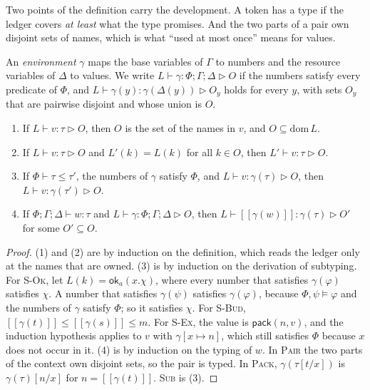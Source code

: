 \documentclass[acmsmall,nonacm,screen]{acmart}
\newcommand{\kw}[1]{\mathsf{#1}}
\newcommand{\ok}[2]{\kw{ok}_{#1}(#2)}
\newcommand{\pack}[2]{\kw{pack}(#1, #2)}
\newcommand{\sem}[1]{[\![#1]\!]}
\newcommand{\dom}{\mathrm{dom}\,}
\newcommand{\own}{\mathrel{\triangleright}}
\begin{document}
Two points of the definition carry the development. A token has a type if the ledger covers
\emph{at least} what the type promises. And the two parts of a pair own disjoint sets of
names, which is what ``used at most once'' means for values.

An \emph{environment} $\gamma$ maps the base variables of $\Gamma$ to numbers and the resource
variables of $\Delta$ to values. We write $L \vdash \gamma : \Phi; \Gamma; \Delta \own O$ if
the numbers satisfy every predicate of $\Phi$, and
$L \vdash \gamma(y) : \gamma(\Delta(y)) \own O_y$ holds for every $y$, with sets $O_y$ that
are pairwise disjoint and whose union is $O$.

\begin{lemma}[Values]
\label{lem:values}
\begin{enumerate}
\item If $L \vdash v : \tau \own O$, then $O$ is the set of the names in $v$, and
  $O \subseteq \dom L$.
\item If $L \vdash v : \tau \own O$ and $L'(k) = L(k)$ for all $k \in O$, then
  $L' \vdash v : \tau \own O$.
\item If $\Phi \vdash \tau \le \tau'$, the numbers of $\gamma$ satisfy $\Phi$, and
  $L \vdash v : \gamma(\tau) \own O$, then $L \vdash v : \gamma(\tau') \own O$.
\item If $\Phi; \Gamma; \Delta \vdash w : \tau$ and
  $L \vdash \gamma : \Phi; \Gamma; \Delta \own O$, then
  $L \vdash \sem{\gamma(w)} : \gamma(\tau) \own O'$ for some $O' \subseteq O$.
\end{enumerate}
\end{lemma}

\begin{proof}
(1) and (2) are by induction on the definition, which reads the ledger only at the names that
are owned. (3) is by induction on the derivation of subtyping. For \textsc{S-Ok}, let
$L(k) = \ok{a}{x.\chi}$, where every number that satisfies $\gamma(\varphi)$ satisfies $\chi$.
A number that satisfies $\gamma(\psi)$ satisfies $\gamma(\varphi)$, because
$\Phi, \psi \models \varphi$ and the numbers of $\gamma$ satisfy $\Phi$; so it satisfies
$\chi$. For \textsc{S-Bud}, $\sem{\gamma(t)} \le \sem{\gamma(s)} \le m$. For \textsc{S-Ex}, the
value is $\pack{n}{v}$, and the induction hypothesis applies to $v$ with $\gamma[x \mapsto n]$,
which still satisfies $\Phi$ because $x$ does not occur in it. (4) is by induction on the
typing of $w$. In \textsc{Pair} the two parts of the context own disjoint sets, so the pair is
typed. In \textsc{Pack}, $\gamma(\tau[t/x])$ is $\gamma(\tau)[n/x]$ for $n = \sem{\gamma(t)}$.
\textsc{Sub} is (3).
\end{proof}
\end{document}
